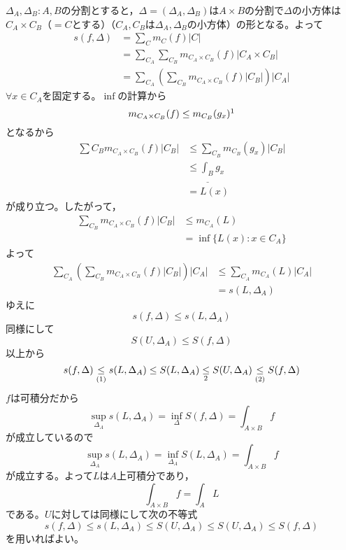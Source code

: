 \documentclass[dvipdfmx,a4j,10pt]{jsarticle}
\makeatletter
\theoremstyle{mystyle1}
\theoremstyle{mystyle2}
\renewenvironment{proof}[1][\proofname]{\par
  \pushQED{\qed}%
  \normalfont
  \topsep6\p@\@plus6\p@ \trivlist
  \item[\hskip\labelsep{\bfseries\sffamily #1}]\ignorespaces
}{%
  \popQED\endtrivlist\@endpefalse
}
\renewcommand\proofname{証明}
\makeatother
\begin{document}
\begin{proof}
	$\Delta_A,\Delta_B:A,B$の分割とすると，$\Delta=(\Delta_A,\Delta_B)$は$A\times B$の分割で$\Delta$の小方体は$C_A\times C_B$（$=C$とする）（$C_A,C_B$は$\Delta_A,\Delta_B$の小方体）の形となる。よって
	\[
	\begin{split}
		s(f,\Delta)
		&=\sum_C m_C(f)|C|\\
		&=\sum_{C_A}\sum_{C_B}m_{C_A\times C_B}(f)|C_A\times C_B|\\
		&=\sum_{C_A}\left(\sum_{C_B}m_{C_A\times C_B}(f)|C_B|\right)|C_A|
	\end{split}
	\]
	$\forall x\in C_A$を固定する。$\inf$の計算から
	\[
	m_{C_A\times C_B}(f)\leq m_{C_B}(g_x)\footnotemark
	\]
	となるから
	\[
	\begin{split}
		\sum{C_B}m_{C_A\times C_B}(f)|C_B|
		&\leq \sum_{C_B}m_{C_B}(g_x)|C_B|\\
		&\leq \underline{\int_B} g_x\\
		&=L(x)
	\end{split}
	\]
	が成り立つ。したがって，
	\[
	\begin{split}
		\sum_{C_B}m_{C_A\times C_B}(f)|C_B|
		&\leq m_{C_A}(L)\\
		&=\inf\{L(x):x\in C_A\}
	\end{split}
	\]
	よって
	\[
	\begin{split}
	\sum_{C_A}\left(\sum_{C_B}m_{C_A\times C_B}(f)|C_B|\right)|C_A|
		&\leq\sum_{C_A} m_{C_A}(L)|C_A|\\
		&= s(L,\Delta_A)
	\end{split}
	\]
	ゆえに
	\begin{equation}\tag{1}
		s(f,\Delta)\leq s(L,\Delta_A)
	\end{equation}
	同様にして
	\begin{equation}\tag{2}
		S(U,\Delta_A)\leq S(f,\Delta)
	\end{equation}
	以上から
	\[
		s(f,\Delta)\underset{(1)}{\leq} s(L,\Delta_A)\leq S(L,\Delta_A) \underset{\footnotemark}{\leq} S(U,\Delta_A) \underset{(2)}{\leq} S(f,\Delta)
	\]
	$f$は可積分だから
	\[
	\sup_{\Delta_A}s(L,\Delta_A)=\inf_{\Delta}S(f,\Delta)=\int_{A\times B}f
	\]
	が成立しているので
	\[
		\sup_{\Delta_A}s(L,\Delta_A)=\inf_{\Delta_A}S(L,\Delta_A)=\int_{A\times B}f
	\]
	が成立する。よって$L$は$A$上可積分であり，
	\[
	\int_{A\times B}f=\int_A L
	\]
	である。$U$に対しては同様にして次の不等式
	\[
		s(f,\Delta)\leq s(L,\Delta_A)\leq S(U,\Delta_A)\leq S(U,\Delta_A)\leq S(f,\Delta)
	\]
	を用いればよい。
\end{proof}
\end{document}
